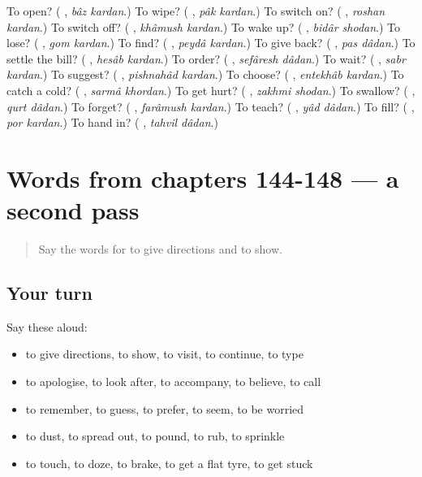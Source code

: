 \begin{tcolorbox}[breakable,colback=teal!4,colframe=teal!35!black,title={Before you move on}]
To open? (\textbf{ }, \emph{bâz kardan}.) To wipe? (\textbf{ }, \emph{pâk kardan}.) To switch on? (\textbf{ }, \emph{roshan kardan}.) To switch off? (\textbf{ }, \emph{khâmush kardan}.) To wake up? (\textbf{ }, \emph{bidâr shodan}.) To lose? (\textbf{ }, \emph{gom kardan}.) To find? (\textbf{ }, \emph{peydâ kardan}.) To give back? (\textbf{ }, \emph{pas dâdan}.) To settle the bill? (\textbf{ }, \emph{hesâb kardan}.) To order? (\textbf{ }, \emph{sefâresh dâdan}.) To wait? (\textbf{ }, \emph{sabr kardan}.) To suggest? (\textbf{ }, \emph{pishnahâd kardan}.) To choose? (\textbf{ }, \emph{entekhâb kardan}.) To catch a cold? (\textbf{ }, \emph{sarmâ khordan}.) To get hurt? (\textbf{ }, \emph{zakhmi shodan}.) To swallow? (\textbf{ }, \emph{qurt dâdan}.) To forget? (\textbf{ }, \emph{farâmush kardan}.) To teach? (\textbf{ }, \emph{yâd dâdan}.) To fill? (\textbf{ }, \emph{por kardan}.) To hand in? (\textbf{ }, \emph{tahvil dâdan}.)
\end{tcolorbox}
\section[(dialogue)]{Words from chapters 144-148 — a second pass}

\label{lesson:FA-R148-second-pass-words-from-chapters-144-148}



\begin{quote}
Say the words for to give directions and to show.
\end{quote}

\subsection*{Your turn}
Say these aloud:

\begin{itemize}
\raggedright
  \item to give directions, to show, to visit, to continue, to type
  \item to apologise, to look after, to accompany, to believe, to call
  \item to remember, to guess, to prefer, to seem, to be worried
  \item to dust, to spread out, to pound, to rub, to sprinkle
  \item to touch, to doze, to brake, to get a flat tyre, to get stuck
\end{itemize}

